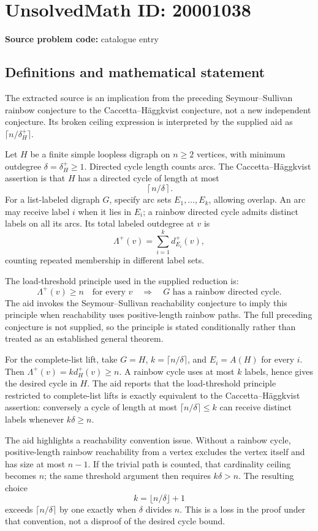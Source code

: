 \documentclass[11pt]{article}
\begin{document}
\section*{UnsolvedMath ID: 20001038}
\textbf{Source problem code:} catalogue entry
\subsection{Definitions and mathematical statement}
The extracted source is an implication from the preceding Seymour--Sullivan rainbow conjecture to the Caccetta--H\"aggkvist conjecture, not a new independent conjecture. Its broken ceiling expression is interpreted by the supplied aid as \(\lceil n/\delta_H^+\rceil\).

Let \(H\) be a finite simple loopless digraph on \(n\ge2\) vertices, with minimum outdegree \(\delta=\delta_H^+\ge1\). Directed cycle length counts arcs. The Caccetta--H\"aggkvist assertion is that \(H\) has a directed cycle of length at most
\[
 \left\lceil n/\delta\right\rceil.
\]
For a list-labeled digraph \(G\), specify arc sets \(E_1,\ldots,E_k\), allowing overlap. An arc may receive label \(i\) when it lies in \(E_i\); a rainbow directed cycle admits distinct labels on all its arcs. Its total labeled outdegree at \(v\) is
\[
 \Lambda^+(v)=\sum_{i=1}^k d^+_{E_i}(v),
\]
counting repeated membership in different label sets.

The load-threshold principle used in the supplied reduction is:
\[
 \Lambda^+(v)\ge n\quad\text{for every }v
 \quad\Longrightarrow\quad G\text{ has a rainbow directed cycle}.
\]
The aid invokes the Seymour--Sullivan reachability conjecture to imply this principle when reachability uses positive-length rainbow paths. The full preceding conjecture is not supplied, so the principle is stated conditionally rather than treated as an established general theorem.

For the complete-list lift, take \(G=H\), \(k=\lceil n/\delta\rceil\), and \(E_i=A(H)\) for every \(i\). Then \(\Lambda^+(v)=k d_H^+(v)\ge n\). A rainbow cycle uses at most \(k\) labels, hence gives the desired cycle in \(H\). The aid reports that the load-threshold principle restricted to complete-list lifts is exactly equivalent to the Caccetta--H\"aggkvist assertion: conversely a cycle of length at most \(\lceil n/\delta\rceil\le k\) can receive distinct labels whenever \(k\delta\ge n\).

The aid highlights a reachability convention issue. Without a rainbow cycle, positive-length rainbow reachability from a vertex excludes the vertex itself and has size at most \(n-1\). If the trivial path is counted, that cardinality ceiling becomes \(n\); the same threshold argument then requires \(k\delta>n\). The resulting choice
\[
 k=\lfloor n/\delta\rfloor+1
\]
exceeds \(\lceil n/\delta\rceil\) by one exactly when \(\delta\) divides \(n\). This is a loss in the proof under that convention, not a disproof of the desired cycle bound.
\end{document}
